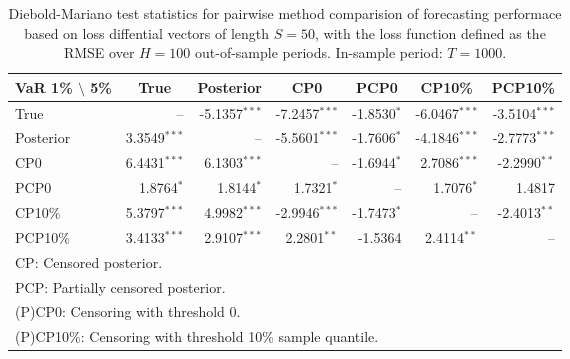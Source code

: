 { \renewcommand{\arraystretch}{1.2} 
\begin{table} 
\center 
\begin{tabular}{l | rrr rrr} 
VaR 1\% $\setminus$ 5\% & \multicolumn{1}{c}{True} & \multicolumn{1}{c}{Posterior} & \multicolumn{1}{c}{CP0} & \multicolumn{1}{c}{PCP0} & \multicolumn{1}{c}{CP10\%} & \multicolumn{1}{c}{PCP10\%} \\ \hline 
True &    --\phantom{$^{***}$} & -5.1357$^{***}$ & -7.2457$^{***}$ & -1.8530$^{*}$\phantom{$^{**}$} & -6.0467$^{***}$ & -3.5104$^{***}$  \\ 
Posterior & 3.3549$^{***}$ &    --\phantom{$^{***}$} & -5.5601$^{***}$ & -1.7606$^{*}$\phantom{$^{**}$} & -4.1846$^{***}$ & -2.7773$^{***}$  \\ 
CP0 & 6.4431$^{***}$ & 6.1303$^{***}$ &    --\phantom{$^{***}$} & -1.6944$^{*}$\phantom{$^{**}$} & 2.7086$^{***}$ & -2.2990$^{**}$\phantom{$^{*}$}  \\ 
PCP0 & 1.8764$^{*}$\phantom{$^{**}$} & 1.8144$^{*}$\phantom{$^{**}$} & 1.7321$^{*}$\phantom{$^{**}$} &    --\phantom{$^{***}$} & 1.7076$^{*}$\phantom{$^{**}$} & 1.4817\phantom{$^{***}$}  \\ 
CP10\% & 5.3797$^{***}$ & 4.9982$^{***}$ & -2.9946$^{***}$ & -1.7473$^{*}$\phantom{$^{**}$} &    --\phantom{$^{***}$} & -2.4013$^{**}$\phantom{$^{*}$}  \\ 
PCP10\% & 3.4133$^{***}$ & 2.9107$^{***}$ & 2.2801$^{**}$\phantom{$^{*}$} & -1.5364\phantom{$^{***}$} & 2.4114$^{**}$\phantom{$^{*}$} &    --\phantom{$^{***}$}  \\ 
\hline 
\multicolumn{7}{l}{\footnotesize{CP: Censored posterior.}}  \\ 
\multicolumn{7}{l}{\footnotesize{PCP: Partially censored posterior.}} \\ 
\multicolumn{7}{l}{\footnotesize{(P)CP0: Censoring with threshold 0.}} \\ 
\multicolumn{7}{l}{\footnotesize{(P)CP10\%: Censoring with threshold 10\% sample quantile.}}  \\ 
\end{tabular}
 \caption{Diebold-Mariano test statistics for  pairwise method comparision of forecasting performace based on loss diffential vectors of length $S = 50$, with the loss function defined as the RMSE over $H=100$ out-of-sample periods. In-sample period: $T = 1000$.} 
\label{tab:garch11_DM_T_1000}  
\end{table}
}